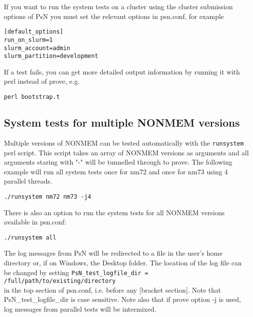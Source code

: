 If you want to run the system tests on a cluster using the cluster submission options of PsN 
you must set the relevant options in psn.conf, for example
\begin{verbatim}
[default_options]
run_on_slurm=1
slurm_account=admin
slurm_partition=development
\end{verbatim}

If a test fails, you can get more detailed output information by running it
with perl instead of prove, e.g.
\begin{verbatim}
perl bootstrap.t
\end{verbatim}

\subsection{System tests for multiple NONMEM versions}
Multiple versions of NONMEM can be tested automatically with the \verb|runsystem| perl script. This script takes
an array of NONMEM versions as arguments and all arguments staring with "-" will be tunnelled through to prove.
The following example will run all system tests once for nm72 and once for nm73 using 4 parallel threads.
\begin{verbatim}
./runsystem nm72 nm73 -j4
\end{verbatim}
There is also an option to run the system tests for all NONMEM versions available in psn.conf:
\begin{verbatim}
./runsystem all
\end{verbatim}
The log messages from PsN will be redirected to a file in the user's home directory or, if on Windows, the
Desktop folder. The location of the log file can be changed by setting
\verb|PsN_test_logfile_dir = /full/path/to/existing/directory| \\
in the top section of psn.conf, i.e. before any [bracket section].
Note that PsN\_test\_logfile\_dir is case sensitive. Note also that if prove option -j is used, log messages from
parallel tests will be intermixed.
